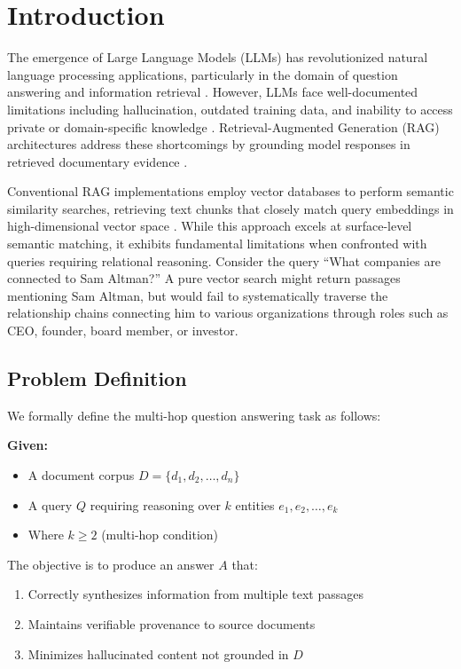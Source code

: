 \documentclass[conference]{IEEEtran}
\begin{document}
\section{Introduction}

The emergence of Large Language Models (LLMs) has revolutionized natural language processing applications, particularly in the domain of question answering and information retrieval \cite{brown2020language}. However, LLMs face well-documented limitations including hallucination, outdated training data, and inability to access private or domain-specific knowledge \cite{ji2023survey}. Retrieval-Augmented Generation (RAG) architectures address these shortcomings by grounding model responses in retrieved documentary evidence \cite{lewis2020retrieval}.

Conventional RAG implementations employ vector databases to perform semantic similarity searches, retrieving text chunks that closely match query embeddings in high-dimensional vector space \cite{karpukhin2020dense}. While this approach excels at surface-level semantic matching, it exhibits fundamental limitations when confronted with queries requiring relational reasoning. Consider the query ``What companies are connected to Sam Altman?'' A pure vector search might return passages mentioning Sam Altman, but would fail to systematically traverse the relationship chains connecting him to various organizations through roles such as CEO, founder, board member, or investor.

\subsection{Problem Definition}

We formally define the multi-hop question answering task as follows:

\textbf{Given:}
\begin{itemize}
    \item A document corpus $D = \{d_1, d_2, \ldots, d_n\}$
    \item A query $Q$ requiring reasoning over $k$ entities $e_1, e_2, \ldots, e_k$
    \item Where $k \geq 2$ (multi-hop condition)
\end{itemize}

The objective is to produce an answer $A$ that:
\begin{enumerate}
    \item Correctly synthesizes information from multiple text passages
    \item Maintains verifiable provenance to source documents
    \item Minimizes hallucinated content not grounded in $D$
\end{enumerate}
\end{document}
